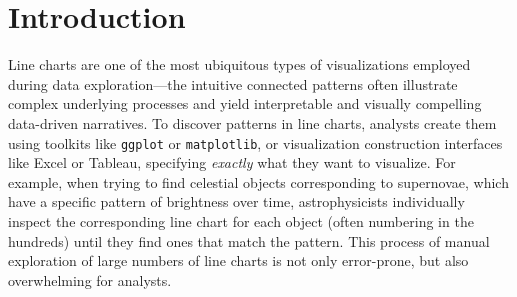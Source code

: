 \section{Introduction\label{sec:intro}}

Line charts are one of the most ubiquitous types
of visualizations employed during data exploration---the 
intuitive connected patterns 
often illustrate complex underlying processes
and yield interpretable and visually compelling data-driven
narratives. 
To discover patterns in line charts,
analysts create them
using toolkits like {\tt ggplot} or {\tt matplotlib},
or visualization construction interfaces
like Excel or Tableau, specifying 
{\em exactly} what they want to visualize.
For example, when trying to find celestial objects 
corresponding to supernovae, which have a specific pattern
of brightness over time, astrophysicists 
individually inspect the corresponding line chart 
for each object (often numbering in the hundreds) 
until they find ones that match the pattern.  
This process of manual exploration of
large numbers of line charts 
is not only error-prone, but also overwhelming for 
analysts.

